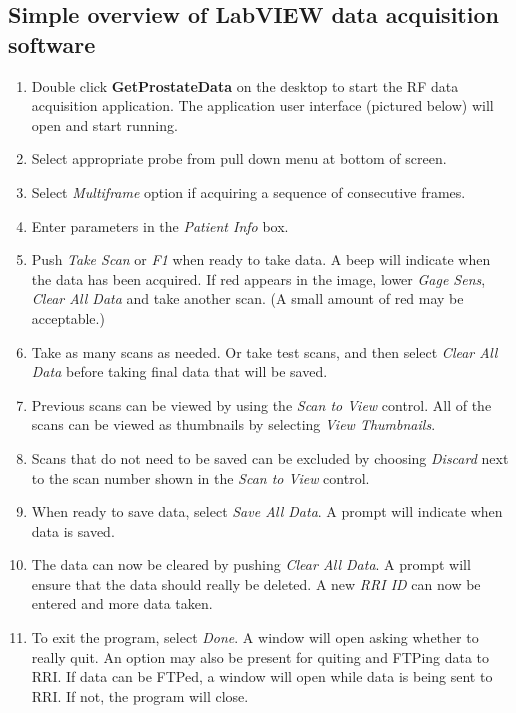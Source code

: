 \documentclass[10pt]{article}
\begin{document}
\pagebreak \clearpage

\subsection*{{\Large Simple overview of LabVIEW data acquisition software}}

\begin{enumerate}
\item Double click {\bf GetProstateData} on the desktop to start the RF data acquisition application.
The application user interface (pictured below) will open and
start running.

\item Select appropriate probe from pull down menu at bottom of
screen.

\item Select {\it Multiframe} option if acquiring a sequence of
consecutive frames.

\item Enter parameters in the {\it Patient Info} box.

\item Push {\it Take Scan} or {\it F1} when ready to take data.
A beep will indicate when the data has been acquired. If red
appears in the image, lower {\it Gage Sens}, {\it Clear All Data}
and take another scan. (A small amount of red may be acceptable.)

\item Take as many scans as needed. Or take test scans, and then select
{\it Clear All Data} before taking final data that will be saved.

\item Previous scans can be viewed by using the {\it Scan to View}
control. All of the scans can be viewed as thumbnails by selecting
{\it View Thumbnails}.

\item Scans that do not need to be saved can be excluded by
choosing {\it Discard} next to the scan number shown in the {\it
Scan to View} control.

\item When ready to save data, select {\it Save All Data}. A
prompt will indicate when data is saved.

\item The data can now be cleared by pushing {\it Clear All Data}.
A prompt will ensure that the data should really be deleted. A new
{\it RRI ID} can now be entered and more data taken.

\item To exit the program, select {\it Done}. A window will open asking
whether to really quit. An option may also be present for quiting
and FTPing data to RRI. If data can be FTPed, a window will open
while data is being sent to RRI. If not, the program will close.


\end{enumerate}
\end{document}
